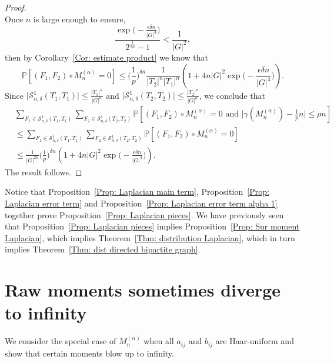 \documentclass[12pt]{amsart}
\theoremstyle{definition}
\newcommand{\PPP}{\mathbb{P}}
\newcommand{\SSO}[3]{\mathcal{S}^1_{#1}(#2,#3)}
\newcommand{\Mna}{M_{n}^{(\alpha)}}
\newcommand{\abs}[1]{\vert#1\vert}
\begin{document}
\begin{proof}
\[\]
Once $n$ is large enough to ensure,
\[
\frac{\exp\Big(-\frac{\epsilon\delta  n}{|G|^4}\Big)}{2^{\frac{1}{2n}}-1}
<\frac{1}{\abs{G}^2},
\]
then by Corollary~\ref{Cor: estimate product} we know that
\[
\PPP[(F_1,F_2)\circ \Mna=0]
\leq \Big(\frac{1}{p}\Big)^{\delta n}
\frac{1}{\abs{T_2}^n \abs{T_1}^n}
\left( 1 + 4n\abs{G}^2\exp\Big(-\frac{\epsilon \delta n}{|G|^4}\Big)\right).
\]
Since $\abs{\SSO{n,\delta}{T_1}{T_1}}\leq \frac{\abs{T_1}^n}{\abs{G}^n} $ and $\abs{\SSO{n,\delta}{T_2}{T_2}}\leq \frac{\abs{T_2}^n}{\abs{G}^n}$, we conclude that
\begin{align*}
&\sum_{F_1\in \SSO{n,\delta}{T_1}{T_1}}
\sum_{F_2\in \SSO{n,\delta}{T_2}{T_2}}
\PPP[(F_1,F_2)\circ \Mna=0 \text{ and } \abs{\gamma(\Mna)-\tfrac{1}{p}n} \leq \rho n]\\
&\leq\sum_{F_1\in \SSO{n,\delta}{T_1}{T_1}}
\sum_{F_2\in \SSO{n,\delta}{T_2}{T_2}}
\PPP[(F_1,F_2)\circ \Mna=0]\\
&\leq \frac{1}{\abs{G}^{2n}} \Big(\frac{1}{p}\Big)^{\delta n}
\left( 1 + 4n\abs{G}^2\exp\Big(-\frac{\epsilon \delta n}{|G|^4}\Big)\right).
\end{align*}
The result follows.
\end{proof}

Notice that Proposition~\ref{Prop: Laplacian main term}, Proposition~\ref{Prop: Laplacian error term} and Proposition~\ref{Prop: Laplacian error term alpha 1} together prove Proposition~\ref{Prop: Laplacian pieces}. We have previously seen that Proposition~\ref{Prop: Laplacian pieces} implies Proposition~\ref{Prop: Sur moment Laplacian}, which implies Theorem~\ref{Thm: distribution Laplacian}, which in turn implies Theorem~\ref{Thm: dist directed bipartite graph}.




















\section{Raw moments sometimes diverge to infinity}\label{Sec: Raw moment infty}

We consider the special case of $\Mna$ when all $a_{ij}$ and $b_{ij}$ are Haar-uniform and show that certain moments blow up to infinity.
\end{document}
